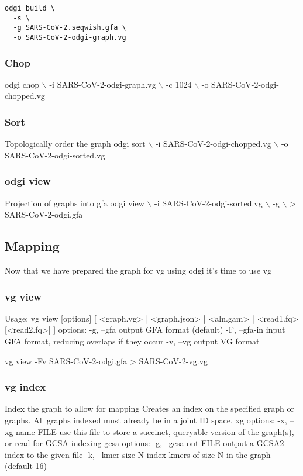 \documentclass[11pt]{article}
\begin{document}
\begin{verbatim}
odgi build \
  -s \
  -g SARS-CoV-2.seqwish.gfa \
  -o SARS-CoV-2-odgi-graph.vg
\end{verbatim}

\subsubsection{Chop}
\label{sec:org08ccf34}
odgi chop $\backslash$
  -i SARS-CoV-2-odgi-graph.vg $\backslash$
  -c 1024 $\backslash$
  -o SARS-CoV-2-odgi-chopped.vg

\subsubsection{Sort}
\label{sec:org83a9d5d}
Topologically order the graph
odgi sort $\backslash$
 -i SARS-CoV-2-odgi-chopped.vg $\backslash$
 -o SARS-CoV-2-odgi-sorted.vg

\subsubsection{odgi view}
\label{sec:org4318f05}
Projection of graphs into gfa
odgi view $\backslash$
 -i SARS-CoV-2-odgi-sorted.vg $\backslash$
 -g $\backslash$
 > SARS-CoV-2-odgi.gfa


\subsection{Mapping}
\label{sec:org5bd7036}
Now that we have prepared the graph for vg using odgi it’s time to use vg
\subsubsection{vg view}
\label{sec:orge102104}
Usage: vg view [options] [ <graph.vg> | <graph.json> | <aln.gam> | <read1.fq> [<read2.fq>] ]
options:
    -g, --gfa                  output GFA format (default)
    -F, --gfa-in               input GFA format, reducing overlaps if they occur
    -v, --vg                   output VG format

vg view -Fv SARS-CoV-2-odgi.gfa > SARS-CoV-2-vg.vg
\subsubsection{vg index}
\label{sec:orgcc35843}
Index the graph to allow for mapping
Creates an index on the specified graph or graphs. All graphs indexed must
already be in a joint ID space.
xg options:
    -x, --xg-name FILE     use this file to store a succinct, queryable version of the graph(s), or read for GCSA indexing
gcsa options:
    -g, --gcsa-out FILE    output a GCSA2 index to the given file
    -k, --kmer-size N      index kmers of size N in the graph (default 16)
\end{document}
